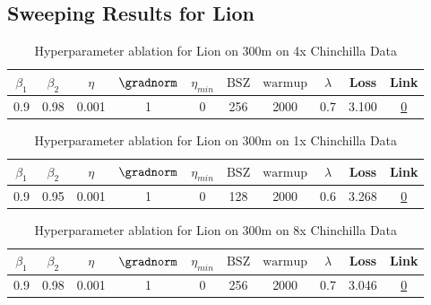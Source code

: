 \subsection{Sweeping Results for Lion}%
\begin{table}[H]
\centering
\caption{Hyperparameter ablation for Lion on 300m on 4x Chinchilla Data}
\label{tab:ablation_lion_300m_4}
\begin{tabular}{cccccccccc}
\toprule
$\beta_1$ & $\beta_2$ & $\eta$ & $\gradnorm$ & $\eta_{min}$ & $\mathrm{BSZ}$ & $\mathrm{warmup}$ & $\lambda$ & Loss & Link \\
\midrule
0.9 & 0.98 & 0.001 & 1 & 0 & 256 & 2000 & 0.7 & 3.100 & \href{https://wandb.ai/stanford-mercury/optimizer-scaling/runs/sweep-300m-24B-lion5aad2alr0.001-wd0.7-minlr0-warmup2000-b10.9-b-edb7fa}{0} \\
\midrule
\bottomrule
\end{tabular}
\end{table}

\begin{table}[H]
\centering
\caption{Hyperparameter ablation for Lion on 300m on 1x Chinchilla Data}
\label{tab:ablation_lion_300m_1}
\begin{tabular}{cccccccccc}
\toprule
$\beta_1$ & $\beta_2$ & $\eta$ & $\gradnorm$ & $\eta_{min}$ & $\mathrm{BSZ}$ & $\mathrm{warmup}$ & $\lambda$ & Loss & Link \\
\midrule
0.9 & 0.95 & 0.001 & 1 & 0 & 128 & 2000 & 0.6 & 3.268 & \href{https://wandb.ai/stanford-mercury/optimizer-scaling/runs/sweep-300m-6B-lion00979clr0.001-wd0.6-minlr0-warmup2000-b10.9-b2-81fdf3}{0} \\
\midrule
\bottomrule
\end{tabular}
\end{table}

\begin{table}[H]
\centering
\caption{Hyperparameter ablation for Lion on 300m on 8x Chinchilla Data}
\label{tab:ablation_lion_300m_8}
\begin{tabular}{cccccccccc}
\toprule
$\beta_1$ & $\beta_2$ & $\eta$ & $\gradnorm$ & $\eta_{min}$ & $\mathrm{BSZ}$ & $\mathrm{warmup}$ & $\lambda$ & Loss & Link \\
\midrule
0.9 & 0.98 & 0.001 & 1 & 0 & 256 & 2000 & 0.7 & 3.046 & \href{https://wandb.ai/stanford-mercury/optimizer-scaling/runs/sweep-300m-48B-lioneb1a25lr0.001-wd0.7-minlr0-warmup2000-b10.9-b-2006af}{0} \\
\midrule
\bottomrule
\end{tabular}
\end{table}

